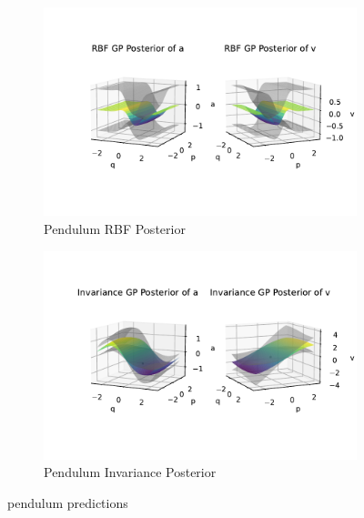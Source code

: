 \documentclass{statsmsc}
\begin{document}
\begin{figure}[H]
     \centering
     \begin{subfigure}[b]{\linewidth}
        \centering
        \includegraphics[width=\linewidth]{../codes/figures/posterior_pendulum_rbf.pdf}
        \caption{Pendulum RBF Posterior}
        \label{fig:posterior_pendulum_rbf}
     \end{subfigure}
     \hfill
     \begin{subfigure}[b]{\linewidth}
         \centering
         \includegraphics[width=\linewidth]{../codes/figures/posterior_pendulum_invariance.pdf}
         \caption{Pendulum Invariance Posterior}
         \label{fig:posterior_pendulum_invariance}
     \end{subfigure}
        \caption{pendulum predictions}
        \label{fig:posterior_pendulum}
\end{figure}
\end{document}

